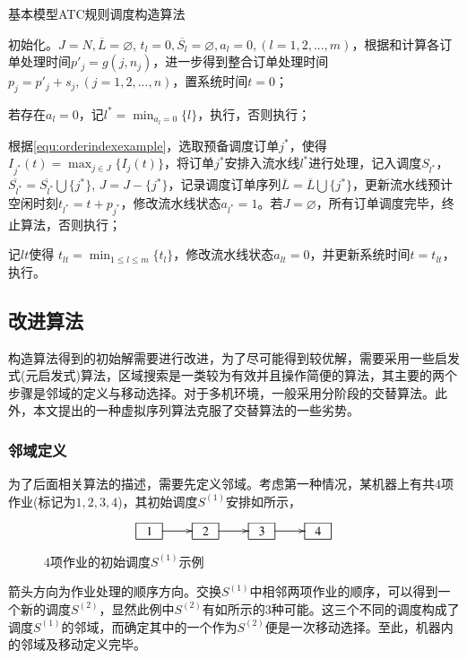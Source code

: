 \begin{algori}
基本模型ATC规则调度构造算法\label{alg:basicconstruct}

\begin{asparaenum}
\renewcommand{\labelenumi}{\bf Step\theenumi~}
\item 初始化。$J = N, \overline{L} = \varnothing$, $t_l = 0, \overline{S_l} = \varnothing, a_l=0, (l = 1,2,...,m)$，根据和计算各订单处理时间$p'_j = g(j, n_j)$，进一步得到整合订单处理时间$p_j = p'_j + s_j, (j = 1,2,...,n)$，置系统时间$t = 0$；
\item 若存在$a_l = 0$，记$l^* = \displaystyle\min_{a_l = 0}\{l\}$，执行，否则执行；
\item 根据\eqref{equ:orderindexexample}，选取预备调度订单$j^*$，使得$I_{j^*}(t) = \displaystyle\max_{j\in J}\{I_j(t)\}$，将订单$j^*$安排入流水线$l^*$进行处理，记入调度$S_{l^*}$，$\overline{S_{l^*}}=\overline{S_{l^*}}\bigcup \{j^*\}$, $J = J -\{j^*\}$，记录调度订单序列$\overline{L} = \overline{L} \bigcup \{j^*\}$，更新流水线预计空闲时刻$t_{l^*} = t + p_{j^*}$，修改流水线状态$a_{l^*} = 1$。若$J = \varnothing$，所有订单调度完毕，终止算法，否则执行；
\item 记$lt$使得 $t_{lt} = \displaystyle\min_{1\le l\le m}\{t_l\}$，修改流水线状态$a_{lt} = 0$，并更新系统时间$t = t_{lt}$，执行。
\end{asparaenum}
\end{algori}

\subsection{改进算法}
构造算法得到的初始解需要进行改进，为了尽可能得到较优解，需要采用一些启发式(元启发式)算法，区域搜索是一类较为有效并且操作简便的算法，其主要的两个步骤是邻域的定义与移动选择。对于多机环境，一般采用分阶段的交替算法。此外，本文提出的一种虚拟序列算法克服了交替算法的一些劣势。

\subsubsection{邻域定义}
为了后面相关算法的描述，需要先定义邻域。考虑第一种情况，某机器上有共$4$项作业(标记为$1,2,3,4$)，其初始调度$S^{(1)}$安排如所示，
\begin{figure}[h]
\begin{equation*}
\xymatrix{
\jobunit{1} \ar[r] & \jobunit{2} \ar[r] &\jobunit{3} \ar[r] &\jobunit{4}
}
\end{equation*}
\caption{$4$项作业的初始调度$S^{(1)}$示例\label{fig:4example}}
\end{figure}
箭头方向为作业处理的顺序方向。交换$S^{(1)}$中相邻两项作业的顺序，可以得到一个新的调度$S^{(2)}$，显然此例中$S^{(2)}$有如所示的$3$种可能。这三个不同的调度构成了调度$S^{(1)}$的邻域，而确定其中的一个作为$S^{(2)}$便是一次移动选择。至此，机器内的邻域及移动定义完毕。

